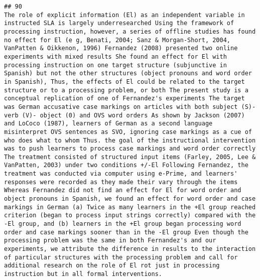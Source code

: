 \documentclass[
  english,
  man]{apa6}
\begin{document}
\begin{verbatim}
## 90                                                                                                                                                                                                                                                                                                                                                                                                                                                   The role of explicit information (El) as an independent variable in instructed SLA is largely underresearched Using the framework of processing instruction, however, a series of offline studies has found no effect for El (e g, Benati, 2004; Sanz & Morgan-Short, 2004, VanPatten & Oikkenon, 1996) Fernandez (2008) presented two online experiments with mixed results She found an effect for El with processing instruction on one target structure (subjunctive in Spanish) but not the other structures (object pronouns and word order in Spanish), Thus, the effects of El could be related to the target structure or to a processing problem, or both The present study is a conceptual replication of one of Fernandez's experiments The target was German accusative case markings on articles with both subject (S)- verb (V)- object (0) and OVS word orders As shown by Jackson (2007) and LoCoco (1987), learners of German as a second language misinterpret OVS sentences as SVO, ignoring case markings as a cue of who does what to whom Thus. the goal of the instructional intervention was to push learners to process case markings and word order correctly The treatment consisted of structured input items (Farley, 2005, Lee & VanPatten, 2003) under two conditions +/-El Following Fernandez, the treatment was conducted via computer using e-Prime, and learners' responses were recorded as they made their vary through the items Whereas Fernandez did not find an effect for El for word order and object pronouns in Spanish, we found an effect for word order and case markings in German (a) Twice as many learners in the +El group reached criterion (began to process input strings correctly) compared with the -El group, and (b) learners in the +El group began processing word order and case markings sooner than in the -El group Even though the processing problem was the same in both Fernandez's and our experiments, we attribute the difference in results to the interaction of particular structures with the processing problem and call for additional research on the role of El rot just in processing instruction but in all formal interventions.

\end{verbatim}
\end{document}
